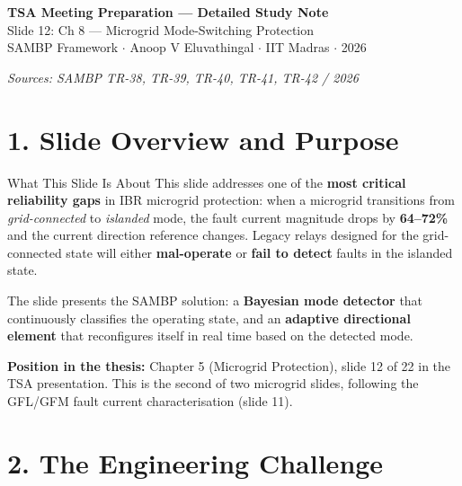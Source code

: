 \documentclass[12pt,a4paper]{article}
\begin{document}
\begin{tcolorbox}[colback=iitmnavy, coltext=white, arc=4pt, boxrule=0pt]
\begin{center}
{\Large\bfseries TSA Meeting Preparation — Detailed Study Note}\\[6pt]
{\large Slide 12: Ch 8 — Microgrid Mode-Switching Protection}\\[4pt]
{\normalsize SAMBP Framework $\cdot$ Anoop V Eluvathingal $\cdot$ IIT Madras $\cdot$ 2026}
\end{center}
\end{tcolorbox}

\vspace{0.5em}
\begin{center}
\small\textit{Sources: SAMBP TR-38, TR-39, TR-40, TR-41, TR-42 / 2026}
\end{center}

\section{1.\; Slide Overview and Purpose}

\begin{keybox}{What This Slide Is About}
This slide addresses one of the \textbf{most critical reliability gaps} in IBR
microgrid protection: when a microgrid transitions from \emph{grid-connected} to
\emph{islanded} mode, the fault current magnitude drops by \textbf{64--72\%} and
the current direction reference changes. Legacy relays designed for the grid-connected
state will either \textbf{mal-operate} or \textbf{fail to detect} faults in the
islanded state.

The slide presents the SAMBP solution: a \textbf{Bayesian mode detector} that
continuously classifies the operating state, and an \textbf{adaptive directional
element} that reconfigures itself in real time based on the detected mode.
\end{keybox}

\noindent\textbf{Position in the thesis:} Chapter 5 (Microgrid Protection), slide 12
of 22 in the TSA presentation. This is the second of two microgrid slides, following the
GFL/GFM fault current characterisation (slide 11).

\section{2.\; The Engineering Challenge}
\end{document}
